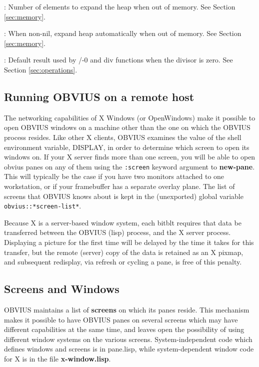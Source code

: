 \begin{description}
\item {}: Number of elements to expand the heap
when out of memory.  See Section \ref{sec:memory}.

\item {}: When non-nil, expand heap automatically
when out of memory.  See Section \ref{sec:memory}.

\item {}: Default result used by /-0 and div
functions when the divisor is zero.  See Section \ref{sec:operations}.
\end{description}


\subsection{Running OBVIUS on a remote host}

The networking capabilities of X Windows (or OpenWindows) make it
possible to open OBVIUS windows on a machine other than the one on
which the OBVIUS process resides. Like other X clients, OBVIUS
examines the value of the shell environment variable, DISPLAY, in
order to determine which screen to open its windows on. If your X
server finds more than one screen, you will be able to open obvius
panes on any of them using the {\tt :screen} keyword argument to {\bf
new-pane}. This will typically be the case if you have two monitors
attached to one workstation, or if your framebuffer has a separate
overlay plane.  The list of screens that OBVIUS knows about is kept in
the (unexported) global variable {\tt obvius::*screen-list*}.

Because X is a server-based window system, each bitblt requires that
data be transferred between the OBVIUS (lisp) process, and the X
server process. Displaying a picture for the first time will be
delayed by the time it takes for this transfer, but the remote
(server) copy of the data is retained as an X pixmap, and subsequent
redisplay, via refresh or cycling a pane, is free of this penalty.


\subsection{Screens and Windows}

OBVIUS maintains a list of {\bf screens} on which its panes reside.
This mechanism makes it possible to have OBVIUS panes on several
screens which may have different capabilities at the same time, and
leaves open the possibility of using different window systems on the
various screens. System-independent code which defines windows and
screens is in pane.lisp, while system-dependent window code for X is
in the file {\bf x-window.lisp}.

